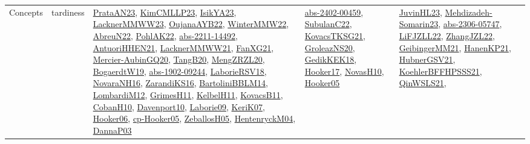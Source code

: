 {\begin{longtable}{llp{6cm}p{6cm}p{6cm}}
Concepts & tardiness & \href{articles/PrataAN23.pdf}{PrataAN23}\cite{PrataAN23}, \href{papers/KimCMLLP23.pdf}{KimCMLLP23}\cite{KimCMLLP23}, \href{articles/IsikYA23.pdf}{IsikYA23}\cite{IsikYA23}, \href{articles/LacknerMMWW23.pdf}{LacknerMMWW23}\cite{LacknerMMWW23}, \href{papers/OujanaAYB22.pdf}{OujanaAYB22}\cite{OujanaAYB22}, \href{papers/WinterMMW22.pdf}{WinterMMW22}\cite{WinterMMW22}, \href{articles/AbreuN22.pdf}{AbreuN22}\cite{AbreuN22}, \href{articles/PohlAK22.pdf}{PohlAK22}\cite{PohlAK22}, \href{articles/abs-2211-14492.pdf}{abs-2211-14492}\cite{abs-2211-14492}, \href{papers/AntuoriHHEN21.pdf}{AntuoriHHEN21}\cite{AntuoriHHEN21}, \href{papers/LacknerMMWW21.pdf}{LacknerMMWW21}\cite{LacknerMMWW21}, \href{articles/FanXG21.pdf}{FanXG21}\cite{FanXG21}, \href{papers/Mercier-AubinGQ20.pdf}{Mercier-AubinGQ20}\cite{Mercier-AubinGQ20}, \href{papers/TangB20.pdf}{TangB20}\cite{TangB20}, \href{articles/MengZRZL20.pdf}{MengZRZL20}\cite{MengZRZL20}, \href{papers/BogaerdtW19.pdf}{BogaerdtW19}\cite{BogaerdtW19}, \href{articles/abs-1902-09244.pdf}{abs-1902-09244}\cite{abs-1902-09244}, \href{articles/LaborieRSV18.pdf}{LaborieRSV18}\cite{LaborieRSV18}, \href{articles/NovaraNH16.pdf}{NovaraNH16}\cite{NovaraNH16}, \href{articles/ZarandiKS16.pdf}{ZarandiKS16}\cite{ZarandiKS16}, \href{papers/BartoliniBBLM14.pdf}{BartoliniBBLM14}\cite{BartoliniBBLM14}, \href{articles/LombardiM12.pdf}{LombardiM12}\cite{LombardiM12}, \href{papers/GrimesH11.pdf}{GrimesH11}\cite{GrimesH11}, \href{articles/KelbelH11.pdf}{KelbelH11}\cite{KelbelH11}, \href{articles/KovacsB11.pdf}{KovacsB11}\cite{KovacsB11}, \href{papers/CobanH10.pdf}{CobanH10}\cite{CobanH10}, \href{papers/Davenport10.pdf}{Davenport10}\cite{Davenport10}, \href{papers/Laborie09.pdf}{Laborie09}\cite{Laborie09}, \href{papers/KeriK07.pdf}{KeriK07}\cite{KeriK07}, \href{articles/Hooker06.pdf}{Hooker06}\cite{Hooker06}, \href{papers/cp-Hooker05.pdf}{cp-Hooker05}\cite{cp-Hooker05}, \href{articles/ZeballosH05.pdf}{ZeballosH05}\cite{ZeballosH05}, \href{papers/HentenryckM04.pdf}{HentenryckM04}\cite{HentenryckM04}, \href{papers/DannaP03.pdf}{DannaP03}\cite{DannaP03} & \href{articles/abs-2402-00459.pdf}{abs-2402-00459}\cite{abs-2402-00459}, \href{articles/SubulanC22.pdf}{SubulanC22}\cite{SubulanC22}, \href{papers/KovacsTKSG21.pdf}{KovacsTKSG21}\cite{KovacsTKSG21}, \href{papers/GroleazNS20.pdf}{GroleazNS20}\cite{GroleazNS20}, \href{articles/GedikKEK18.pdf}{GedikKEK18}\cite{GedikKEK18}, \href{papers/Hooker17.pdf}{Hooker17}\cite{Hooker17}, \href{articles/NovasH10.pdf}{NovasH10}\cite{NovasH10}, \href{articles/Hooker05.pdf}{Hooker05}\cite{Hooker05} & \href{papers/JuvinHL23.pdf}{JuvinHL23}\cite{JuvinHL23}, \href{papers/Mehdizadeh-Somarin23.pdf}{Mehdizadeh-Somarin23}\cite{Mehdizadeh-Somarin23}, \href{articles/abs-2306-05747.pdf}{abs-2306-05747}\cite{abs-2306-05747}, \href{papers/LiFJZLL22.pdf}{LiFJZLL22}\cite{LiFJZLL22}, \href{papers/ZhangJZL22.pdf}{ZhangJZL22}\cite{ZhangJZL22}, \href{papers/GeibingerMM21.pdf}{GeibingerMM21}\cite{GeibingerMM21}, \href{papers/HanenKP21.pdf}{HanenKP21}\cite{HanenKP21}, \href{articles/HubnerGSV21.pdf}{HubnerGSV21}\cite{HubnerGSV21}, \href{articles/KoehlerBFFHPSSS21.pdf}{KoehlerBFFHPSSS21}\cite{KoehlerBFFHPSSS21}, \href{articles/QinWSLS21.pdf}{QinWSLS21}\cite{QinWSLS21}, 
\end{longtable}}
